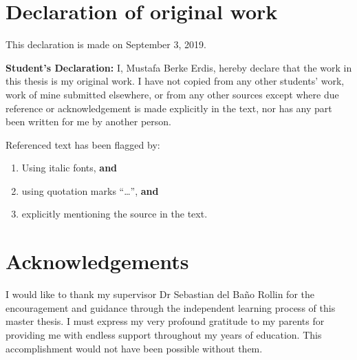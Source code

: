 \documentclass[12pt, oneside]{book}
\theoremstyle{plain}
\theoremstyle{definition}
\begin{document}
\chapter*{Declaration of original work}
\begin{flushright}
This declaration is made on September 3, 2019.
\end{flushright}


{\bf Student's Declaration:}
I, Mustafa Berke Erdis, hereby declare that the work in this thesis 
is my original work. I have not copied from any other students' work, work of 
mine submitted elsewhere,  or from any other sources except where due reference or acknowledgement is made explicitly in the text, nor has any part been written for me by another person.

Referenced text has been flagged by:
\begin{enumerate}
\item Using italic fonts, {\bf and} %
\item using quotation marks ``\ldots '', {\bf and}
\item explicitly mentioning the source in the text.
\end{enumerate}


\chapter*{Acknowledgements}
I would like to thank my supervisor Dr Sebastian del Ba\~{n}o Rollin for the encouragement and guidance through the independent learning process of this master thesis. I must express my very profound gratitude to my parents for providing me with endless support throughout my years of education. This accomplishment would not have been possible without them.
\end{document}
